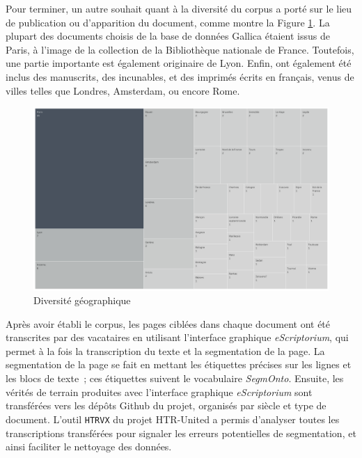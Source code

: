 \documentclass[class=article, crop=false]{standalone}
\begin{document}
Pour terminer, un autre souhait quant à la diversité du corpus a porté sur le lieu de publication ou d'apparition du document, comme montre la Figure \ref{fig:diversite_ville}. La plupart des documents choisis de la base de données Gallica étaient issus de Paris, à l'image de la collection de la Bibliothèque nationale de France. Toutefois, une partie importante est également originaire de Lyon. Enfin, ont également été inclus des manuscrits, des incunables, et des imprimés écrits en français, venus de villes telles que Londres, Amsterdam, ou encore Rome.

\begin{figure}[hbt!]
\includegraphics[width=\textwidth]{../../../images/diversite_ville.png}
\caption{Diversité géographique}
\label{fig:diversite_ville}
\end{figure}

Après avoir établi le corpus, les pages ciblées dans chaque document ont été transcrites par des vacataires en utilisant l'interface graphique \textit{eScriptorium}, qui permet à la fois la transcription du texte et la segmentation de la page. La segmentation de la page se fait en mettant les étiquettes précises sur les lignes et les blocs de texte~; ces étiquettes suivent le vocabulaire \textit{SegmOnto}. Ensuite, les vérités de terrain produites avec l'interface graphique \textit{eScriptorium} sont transférées vers les dépôts Github du projet, organisés par siècle et type de document. L'outil \texttt{HTRVX} du projet \Gls{HTR-United} a permis d'analyser toutes les transcriptions transférées pour signaler les erreurs potentielles de segmentation, et ainsi faciliter le nettoyage des données.
\end{document}
